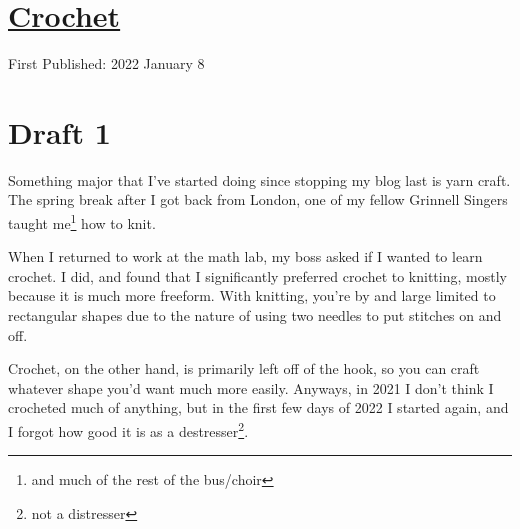 \documentclass[12pt]{article}[titlepage]
\newcommand{\1}{\={a}}
\newcommand{\2}{\={e}}
\newcommand{\3}{\={\i}}
\newcommand{\4}{\=o}
\newcommand{\5}{\=u}
\newcommand{\6}{\={A}}
\renewcommand{\,}{\textsuperscript{,}}
\begin{document}
\doublespacing
\section{\href{crochet.html}{Crochet}}
First Published: 2022 January 8
\section{Draft 1}
Something major that I've started doing since stopping my blog last is yarn craft.
The spring break after I got back from London, one of my fellow Grinnell Singers taught me\footnote{and much of the rest of the bus/choir} how to knit.

When I returned to work at the math lab, my boss asked if I wanted to learn crochet.
I did, and found that I significantly preferred crochet to knitting, mostly because it is much more freeform.
With knitting, you're by and large limited to rectangular shapes due to the nature of using two needles to put stitches on and off.

Crochet, on the other hand, is primarily left off of the hook, so you can craft whatever shape you'd want much more easily.
Anyways, in 2021 I don't think I crocheted much of anything, but in the first few days of 2022 I started again, and I forgot how good it is as a destresser\footnote{not a distresser}.
\end{document}
